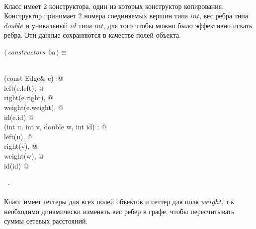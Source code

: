 \documentclass[12pt]{article}
\begin{document}
\paragraph{}
Класс имеет 2 конструктора, один из которых конструктор копирования.
Конструктор принимает 2 номера соединяемых вершин типа $int$, 
вес ребра типа $double$ и уникальный $id$ типа $int$, для того чтобы 
можно было эффективно искать ребра. Эти данные сохраняются в качестве
полей объекта. 

\begin{flushleft} \small
\begin{minipage}{\linewidth}\label{scrap2}\raggedright\small
{} $\langle\,${\itshape constructors}\nobreak\ {\footnotesize {6a}}$\,\rangle\equiv$
\vspace{-1ex}
\begin{list}{}{} \item
\mbox{}\verb@@\\
\mbox{}\verb@Edge(const Edge& e) :@\\
\mbox{}\verb@    left(e.left), @\\
\mbox{}\verb@    right(e.right), @\\
\mbox{}\verb@    weight(e.weight), @\\
\mbox{}\verb@    id(e.id) { }@\\
\mbox{}\verb@Edge(int u, int v, double w, int id) : @\\
\mbox{}\verb@    left(u), @\\
\mbox{}\verb@    right(v), @\\
\mbox{}\verb@    weight(w), @\\
\mbox{}\verb@    id(id) { }@\\
\mbox{}\verb@@{\NWsep}
\end{list}
\vspace{-1.5ex}
\footnotesize
\begin{list}{}{\setlength{\itemsep}{-\parsep}\setlength{\itemindent}{-\leftmargin}}
\item \NWtxtMacroRefIn\ .

\item{}
\end{list}
\end{minipage}\vspace{4ex}
\end{flushleft}
\paragraph{}
Класс имеет геттеры для всех полей объектов и сеттер для поля $weight$, т.к.
необходимо динамически изменять вес ребер в графе, чтобы пересчитывать суммы сетевых расстояний.
\end{document}
